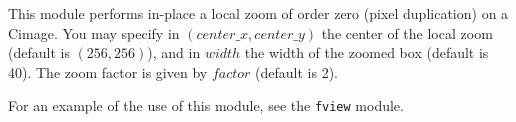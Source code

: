 This module performs in-place a local zoom of order zero 
(pixel duplication) on a Cimage.
You may specify in $(center\_x,center\_y)$ 
the center of the local zoom (default
is $(256,256)$), and in $width$ the width of the zoomed box (default is 40).
The zoom factor is given by $factor$ (default is 2).

For an example of the use of this module, see the \verb+fview+ module.

